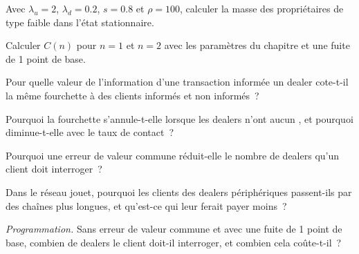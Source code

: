 \begin{exercise}[$\star$]\label{exo:mx:request-for-quote-and-dealer-markets-in-theory:1}
Avec $\lambda_u=2$, $\lambda_d=0.2$, $s=0.8$ et $\rho=100$, calculer la masse des propriétaires de type faible dans l'état stationnaire.
\end{exercise}

\begin{exercise}[$\star$]\label{exo:mx:request-for-quote-and-dealer-markets-in-theory:2}
Calculer $C(n)$ pour $n=1$ et $n=2$ avec les paramètres du chapitre et une fuite de 1 point de base.
\end{exercise}

\begin{exercise}[$\star$]\label{exo:mx:request-for-quote-and-dealer-markets-in-theory:3}
Pour quelle valeur de l'information d'une transaction informée un dealer cote-t-il la même fourchette à des clients informés et non informés~?
\end{exercise}

\begin{exercise}[$\star\star$]\label{exo:mx:request-for-quote-and-dealer-markets-in-theory:4}
Pourquoi la fourchette s'annule-t-elle lorsque les dealers n'ont aucun , et pourquoi diminue-t-elle avec le taux de contact~?
\end{exercise}

\begin{exercise}[$\star\star$]\label{exo:mx:request-for-quote-and-dealer-markets-in-theory:5}
Pourquoi une erreur de valeur commune réduit-elle le nombre de dealers qu'un client doit interroger~?
\end{exercise}

\begin{exercise}[$\star\star$]\label{exo:mx:request-for-quote-and-dealer-markets-in-theory:6}
Dans le réseau jouet, pourquoi les clients des dealers périphériques passent-ils par des chaînes plus longues, et qu'est-ce qui leur ferait payer moins~?
\end{exercise}

\begin{exercise}[$\star\star\star$]\label{exo:mx:request-for-quote-and-dealer-markets-in-theory:7}
\emph{Programmation.} Sans erreur de valeur commune et avec une fuite de 1 point de base, combien de dealers le client doit-il interroger, et combien cela coûte-t-il~?
\end{exercise}

